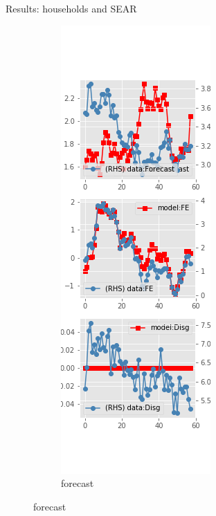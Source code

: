\documentclass{beamer}
\begin{document}
\begin{frame}{Results: households and SEAR}
	\begin{figure}[ht]
	\label{SE_diag_SCE}
	\begin{subfigure}[b]{0.19\textwidth}
		\centering
		\caption{forecast}
			\includegraphics[width=\textwidth, height = 0.8\textheight]{figuresDraft/sce_se_est_diag0.png}

\end{subfigure}
\end{figure}
\end{frame}
\end{document}

